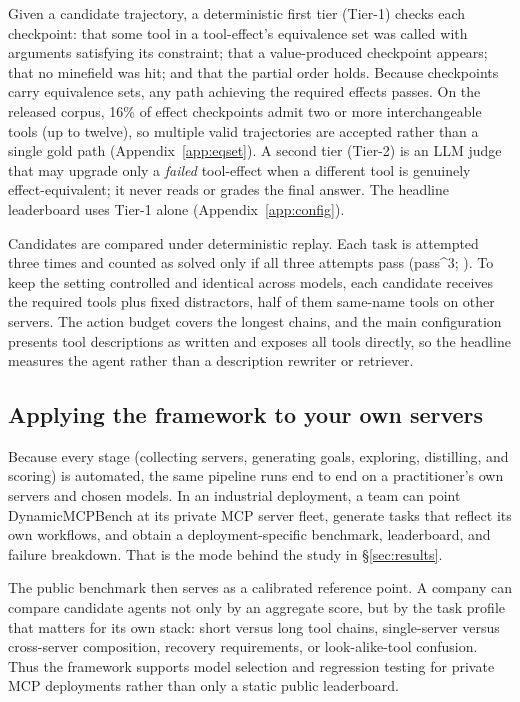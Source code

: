 Given a candidate trajectory, a deterministic first tier (Tier-1) checks each
checkpoint: that some tool in a tool-effect's equivalence set was called with
arguments satisfying its constraint; that a value-produced checkpoint appears;
that no minefield was hit; and that the partial order holds. Because
checkpoints carry equivalence sets, any path achieving the required effects
passes. On the released corpus, 16\% of effect checkpoints admit two or more
interchangeable tools (up to twelve), so multiple valid trajectories are
accepted rather than a single gold path (Appendix~\ref{app:eqset}). A second
tier (Tier-2) is an LLM judge that may upgrade only a \emph{failed}
tool-effect when a different tool is genuinely effect-equivalent; it never
reads or grades the final answer. The headline leaderboard uses Tier-1 alone
(Appendix~\ref{app:config}).

Candidates are compared under deterministic replay. Each task is attempted
three times and counted as solved only if all three attempts pass
(pass\textasciicircum{}3; \citealp{yao2024tau}). To keep the setting controlled and identical
across models, each candidate receives the required tools plus fixed
distractors, half of them same-name tools on other servers. The action budget
covers the longest chains, and the main configuration presents tool
descriptions as written and exposes all tools directly, so the headline
measures the agent rather than a description rewriter or retriever.


\subsection{Applying the framework to your own servers}
\label{sec:benchmark:apply}

Because every stage (collecting servers, generating goals, exploring,
distilling, and scoring) is automated, the same pipeline runs end to end on a
practitioner's own servers and chosen models. In an industrial deployment, a
team can point DynamicMCPBench at its private MCP server fleet, generate tasks
that reflect its own workflows, and obtain a deployment-specific benchmark,
leaderboard, and failure breakdown. That is the mode behind the study in \S\ref{sec:results}.

The public benchmark then serves as a calibrated reference point. A company can
compare candidate agents not only by an aggregate score, but by the task
profile that matters for its own stack: short versus long tool chains,
single-server versus cross-server composition, recovery requirements, or
look-alike-tool confusion. Thus the framework supports model selection and
regression testing for private MCP deployments rather than only a static public
leaderboard.

